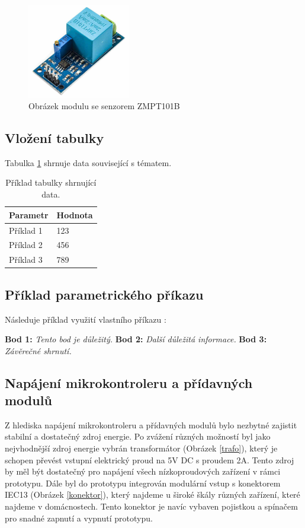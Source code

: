 \documentclass{article}
\newcommand{\sectionbreak}{\clearpage}
\newcommand{\point}[2]{\noindent \textbf{#1:} \textit{#2}}
\begin{document}
\begin{figure}[h!]
        \centering
        \includegraphics[width=0.4\textwidth]{images/zmpt101b.jpg}
        \caption{Obrázek modulu se senzorem ZMPT101B\cite{obrazek_zmpt}}
        \label{modul se senzorem ZMPT101B}
\end{figure}


\subsection{Vložení tabulky}
Tabulka \ref{tab:example} shrnuje data související s tématem.

\begin{table}[h!]
    \centering
    \begin{tabular}{ll}
        \toprule
        \textbf{Parametr} & \textbf{Hodnota} \\
        \midrule
        Příklad 1 & 123 \\
        Příklad 2 & 456 \\
        Příklad 3 & 789 \\
        \bottomrule
    \end{tabular}
    \caption{Příklad tabulky shrnující data.}
    \label{tab:example}
\end{table}

\subsection{Příklad parametrického příkazu}
Následuje příklad využití vlastního příkazu \texttt{\point}:

\point{Bod 1}{Tento bod je důležitý.}
\point{Bod 2}{Další důležitá informace.}
\point{Bod 3}{Závěrečné shrnutí.}

\sectionbreak

\subsection{Napájení mikrokontroleru a přídavných modulů} 
Z hlediska napájení mikrokontroleru a přídavných modulů bylo nezbytné zajistit stabilní a dostatečný zdroj 
energie. Po zvážení různých možností byl jako nejvhodnější zdroj energie vybrán transformátor (Obrázek 
\ref{trafo}), který je schopen převést vstupní elektrický proud na 5V DC s proudem 2A. Tento zdroj by měl být 
dostatečný pro napájení všech nízkoproudových zařízení v rámci prototypu. Dále byl do prototypu integrován 
modulární vstup s konektorem IEC13 (Obrázek \ref{konektor}), který najdeme u široké škály různých zařízení, 
které najdeme v domácnostech. Tento konektor je navíc vybaven pojistkou a spínačem pro snadné zapnutí a 
vypnutí prototypu.
\end{document}
